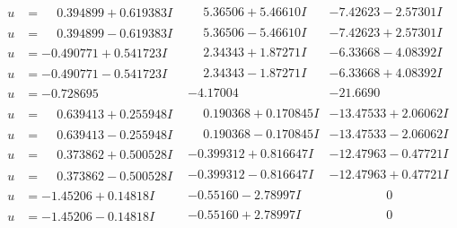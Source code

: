 \documentclass[1p]{elsarticle_modified}
\theoremstyle{definition}
\begin{document}
$$\begin{array}{c|c|c}
\begin{aligned}
u &= \phantom{-}0.394899 + 0.619383 I\end{aligned}
 & \phantom{-}5.36506 + 5.46610 I & -7.42623 - 2.57301 I \\ \hline\begin{aligned}
u &= \phantom{-}0.394899 - 0.619383 I\end{aligned}
 & \phantom{-}5.36506 - 5.46610 I & -7.42623 + 2.57301 I \\ \hline\begin{aligned}
u &= -0.490771 + 0.541723 I\end{aligned}
 & \phantom{-}2.34343 + 1.87271 I & -6.33668 - 4.08392 I \\ \hline\begin{aligned}
u &= -0.490771 - 0.541723 I\end{aligned}
 & \phantom{-}2.34343 - 1.87271 I & -6.33668 + 4.08392 I \\ \hline\begin{aligned}
u &= -0.728695\phantom{ +0.000000I}\end{aligned}
 & -4.17004\phantom{ +0.000000I} & -21.6690\phantom{ +0.000000I} \\ \hline\begin{aligned}
u &= \phantom{-}0.639413 + 0.255948 I\end{aligned}
 & \phantom{-}0.190368 + 0.170845 I & -13.47533 + 2.06062 I \\ \hline\begin{aligned}
u &= \phantom{-}0.639413 - 0.255948 I\end{aligned}
 & \phantom{-}0.190368 - 0.170845 I & -13.47533 - 2.06062 I \\ \hline\begin{aligned}
u &= \phantom{-}0.373862 + 0.500528 I\end{aligned}
 & -0.399312 + 0.816647 I & -12.47963 - 0.47721 I \\ \hline\begin{aligned}
u &= \phantom{-}0.373862 - 0.500528 I\end{aligned}
 & -0.399312 - 0.816647 I & -12.47963 + 0.47721 I \\ \hline\begin{aligned}
u &= -1.45206 + 0.14818 I\end{aligned}
 & -0.55160 - 2.78997 I & \phantom{-0.000000 } 0 \\ \hline\begin{aligned}
u &= -1.45206 - 0.14818 I\end{aligned}
 & -0.55160 + 2.78997 I & \phantom{-0.000000 } 0 \\ \hline\begin{aligned}

\end{aligned}
\end{array}$$
\end{document}
